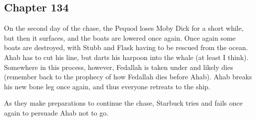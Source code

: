 \subsection{Chapter 134}

On the second day of the chase, the Pequod loses Moby Dick for a short while,
but then it surfaces, and the boats are lowered once again. Once again some
boats are destroyed, with Stubb and Flask having to be rescued from the ocean.
Ahab has to cut his line, but darts his harpoon into the whale (at least I
think). Somewhere in this process, however, Fedallah is taken under and likely
dies (remember back to the prophecy of how Fedallah dies before Ahab). Ahab
breaks his new bone leg once again, and thus everyone retreats to the ship.

As they make preparations to continue the chase, Starbuck tries and fails once
again to persuade Ahab not to go.
